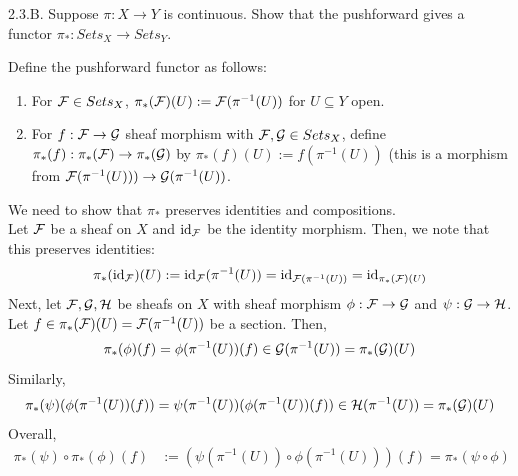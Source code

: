 \begin{exercise}{2.3.B.} 
    Suppose $\pi: X \to Y$ is continuous. Show that the pushforward gives a functor $\pi_*: Sets_X \to Sets_Y$. 
\end{exercise}
\begin{solution}
    Define the pushforward functor as follows: 
    \begin{enumerate}[topsep=1pt, itemsep=1pt]
        \item For $\mathcal{F} \in Sets_X$, $\pi_*(\mathcal{F})(U) := \mathcal{F}(\pi^{-1}(U))$ for $U \subseteq Y$ open.
        \item For $f: \mathcal{F} \to \mathcal{G}$ sheaf morphism with $\mathcal{F}, \mathcal{G} \in Sets_X$, define $\pi_*(f): \pi_*(\mathcal{F}) \to \pi_*(\mathcal{G})$ by $\pi_*(f)(U) := f(\pi^{-1}(U))$ (this is a morphism from $\mathcal{F}(\pi^{-1}(U))) \to \mathcal{G}(\pi^{-1}(U))$.
    \end{enumerate}
    We need to show that $\pi_*$ preserves identities and compositions. \\
    Let $\mathcal{F}$ be a sheaf on $X$ and $\operatorname{id}_{\mathcal{F}}$ be the identity morphism. Then, we note that this preserves identities:
    \[ \pi_*(\operatorname{id}_{\mathcal{F}})(U) := \operatorname{id}_{\mathcal{F}}(\pi^{-1}(U)) = \operatorname{id}_{\mathcal{F}(\pi^{-1}(U))} = \operatorname{id}_{\pi_*(\mathcal{F})(U)}\] 
    Next, let $\mathcal{F}, \mathcal{G}, \mathcal{H}$ be sheafs on $X$ with sheaf morphism $\phi: \mathcal{F} \to \mathcal{G}$ and $\psi: \mathcal{G} \to \mathcal{H}$. Let $f \in \pi_*(\mathcal{F})(U) = \mathcal{F}(\pi^{-1}(U))$ be a section. Then, 
    \[\pi_*(\phi)(f) = \phi(\pi^{-1}(U))(f) \in \mathcal{G}(\pi^{-1}(U)) = \pi_*(\mathcal{G})(U)\] 
    Similarly, 
    \[\pi_*(\psi)(\phi(\pi^{-1}(U))(f)) = \psi(\pi^{-1}(U))(\phi(\pi^{-1}(U))(f)) \in \mathcal{H}(\pi^{-1}(U)) = \pi_*(\mathcal{G})(U)\]  
    Overall,  
    \begin{align*}
        \pi_*(\psi) \circ \pi_*(\phi)(f) &:= (\psi(\pi^{-1}(U)) \circ \phi(\pi^{-1}(U)))(f) = \pi_*(\psi \circ \phi)
    \end{align*}

\end{solution}

